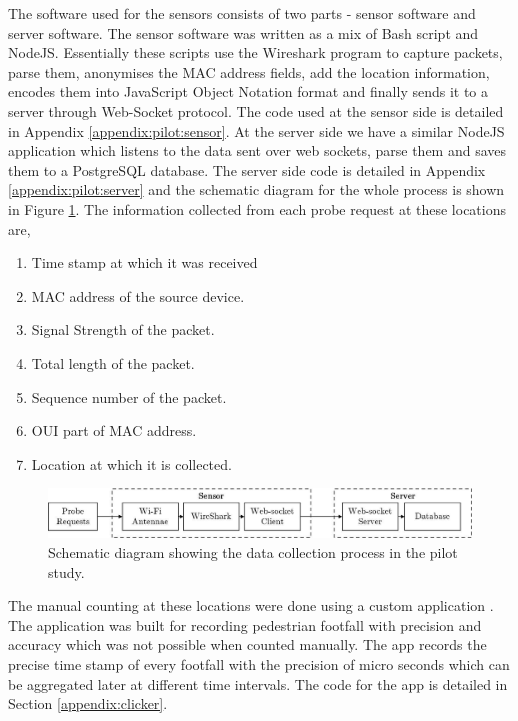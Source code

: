 The software used for the sensors consists of two parts - sensor software and server software.
The sensor software was written as a mix of Bash script and NodeJS.
Essentially these scripts use the Wireshark program to capture packets, parse them, anonymises the MAC address fields, add the location information, encodes them into JavaScript Object Notation format and finally sends it to a server through Web-Socket protocol.
The code used at the sensor side is detailed in Appendix \ref{appendix:pilot:sensor}.
At the server side we have a similar NodeJS application which listens to the data sent over web sockets, parse them and saves them to a PostgreSQL database.
The server side code is detailed in Appendix \ref{appendix:pilot:server} and the schematic diagram for the whole process is shown in Figure \ref{figure:collection:pilot:schema}.
The information collected from each probe request at these locations are,

\begin{enumerate}[leftmargin=4em, rightmargin=2em]
  \itemsep-0.25em
  \item Time stamp at which it was received
  \item MAC address of the source device.
  \item Signal Strength of the packet.
  \item Total length of the packet.
  \item Sequence number of the packet.
  \item OUI part of MAC address.
  \item Location at which it is collected.
\end{enumerate}

\begin{figure}
  \includegraphics{images/pilot-study-system.jpeg}
  \caption{Schematic diagram showing the data collection process in the pilot study.}
  \label{figure:collection:pilot:schema}
\end{figure}

The manual counting at these locations were done using a custom application \citet{bala2018}. The application was built for recording pedestrian footfall with precision and accuracy which was not possible when counted manually. The app records the precise time stamp of every footfall with the precision of micro seconds which can be aggregated later at different time intervals. The code for the app is detailed in Section \ref{appendix:clicker}.

